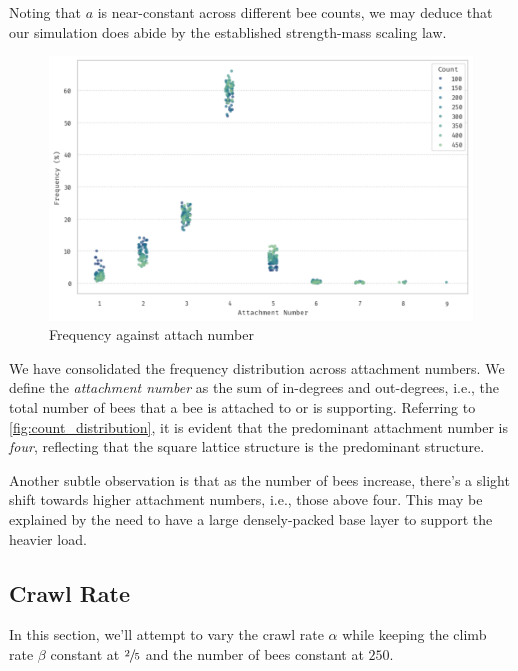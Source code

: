 \documentclass[a4paper,10pt]{article}
\begin{document}
\begin{multicols}{2}
    Noting that $a$ is near-constant across different bee counts, we may deduce that our
    simulation does abide by the established strength-mass scaling law.

    \begin{figure}[H]
        \centering
        \includegraphics[width=\linewidth]{bee_count_distribution.pdf}
        \caption{Frequency against attach number}
        \label{fig:count_distribution}
    \end{figure}

    We have consolidated the frequency distribution across attachment numbers.
    We define the \textit{attachment number} as the sum of in-degrees and
    out-degrees, i.e., the total number of bees that a bee is attached to or is supporting.
    Referring to \autoref{fig:count_distribution}, it is evident that the predominant
    attachment number is \textit{four}, reflecting that the square lattice structure is
    the predominant structure.

    Another subtle observation is that as the number of
    bees increase, there's a slight shift towards higher attachment numbers, i.e., those
    above four. This may be explained by the need to have a large densely-packed base layer to
    support the heavier load.

    \subsection{Crawl Rate}

    In this section, we'll attempt to vary the crawl rate $\alpha$ while keeping the
    climb rate $\beta$ constant at $\sfrac{2}{5}$ and the number of bees constant at $250$.


\end{multicols}
\end{document}
